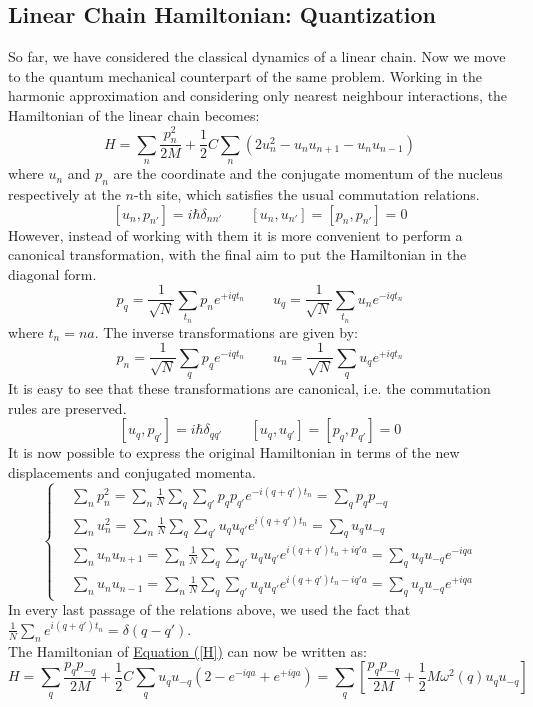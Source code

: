 \documentclass[10.75pt,a4paper,openright,bottom=2cm]{article}
\newcommand{\RN}[1]{%
  \textup{\uppercase\expandafter{\romannumeral#1}}%
}
\begin{document}
\subsection{Linear Chain Hamiltonian: \RN{1} Quantization}
So far, we have considered the classical dynamics of a linear chain. Now we move to the quantum mechanical counterpart of the same problem. Working in the harmonic approximation and considering only nearest neighbour interactions, the Hamiltonian of the linear chain becomes:
\begin{equation}
\label{H}
H=\sum_n\frac{p_n^2}{2M}+\frac{1}{2}C\sum_n(2u_n^2-u_nu_{n+1}-u_nu_{n-1})
\end{equation}
where $u_n$ and $p_n$ are the coordinate and the conjugate momentum of the nucleus respectively at the $n$-th site, which satisfies the usual commutation relations.
\[
[u_n,p_{n'}]=i\hbar\delta_{nn'} \qquad [u_n,u_{n'}]=[p_n,p_{n'}]=0
\]
However, instead of working with them it is more convenient to perform a canonical transformation, with the final aim to put the Hamiltonian in the diagonal form.
\[
p_q=\frac{1}{\sqrt{N}}\sum_{t_n}p_ne^{+iqt_n} \qquad u_q=\frac{1}{\sqrt{N}}\sum_{t_n}u_ne^{-iqt_n}
\]
where $t_n=na$. The inverse transformations are given by:
\[
p_n=\frac{1}{\sqrt{N}}\sum_qp_qe^{-iqt_n} \qquad u_n=\frac{1}{\sqrt{N}}\sum_qu_qe^{+iqt_n}
\]
It is easy to see that these transformations are canonical, i.e. the commutation rules are preserved.
\[
[u_q,p_{q'}]=i\hbar\delta_{qq'} \qquad [u_q,u_{q'}]=[p_q,p_{q'}]=0
\]
It is now possible to express the original Hamiltonian in terms of the new displacements and conjugated momenta.
\[
\left\{
\begin{aligned}
&\sum_np_n^2=\sum_n\frac{1}{N}\sum_q\sum_{q'}p_qp_{q'}e^{-i(q+q')t_n}=\sum_qp_qp_{-q}\\
&\sum_nu_n^2=\sum_n\frac{1}{N}\sum_q\sum_{q'}u_qu_{q'}e^{i(q+q')t_n}=\sum_qu_qu_{-q}\\
&\sum_nu_nu_{n+1}=\sum_n\frac{1}{N}\sum_q\sum_{q'}u_qu_{q'}e^{i(q+q')t_n+iq'a}=\sum_qu_qu_{-q}e^{-iqa}\\
&\sum_nu_nu_{n-1}=\sum_n\frac{1}{N}\sum_q\sum_{q'}u_qu_{q'}e^{i(q+q')t_n-iq'a}=\sum_qu_qu_{-q}e^{+iqa}
\end{aligned}
\right.
\]
In every last passage of the relations above, we used the fact that $\frac{1}{N}\sum_ne^{i(q+q')t_n}=\delta(q-q')$.\\
The Hamiltonian of \hyperref[H]{Equation (\ref{H})} can now be written as:
\begin{equation}
\label{H1}
H=\sum_q\frac{p_qp_{-q}}{2M}+\frac{1}{2}C\sum_qu_qu_{-q}(2-e^{-iqa}+e^{+iqa})=\sum_q\left[\frac{p_qp_{-q}}{2M}+\frac{1}{2}M\omega^2(q)u_qu_{-q}\right]
\end{equation}
\end{document}
